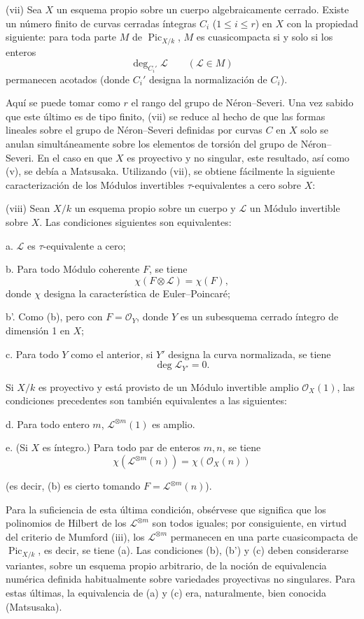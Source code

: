 \medskip
\noindent(vii) Sea $X$ un esquema propio sobre un cuerpo algebraicamente
cerrado. Existe un número finito de curvas cerradas íntegras $C_i$
($1\leq i\leq r$) en $X$ con la propiedad siguiente: para toda parte $M$ de
$\operatorname{Pic}_{X/k}$, $M$ es cuasicompacta si y solo si los enteros
\[
\deg_{C_i'}\mathcal L\qquad(\mathcal L\in M)
\]
permanecen acotados (donde $C_i'$ designa la normalización de $C_i$).

Aquí se puede tomar como $r$ el rango del grupo de Néron--Severi. Una vez
sabido que este último es de tipo finito, (vii) se reduce al hecho de que las
formas lineales sobre el grupo de Néron--Severi definidas por curvas $C$ en
$X$ solo se anulan simultáneamente sobre los elementos de torsión del grupo de
Néron--Severi. En el caso en que $X$ es proyectivo y no singular, este
resultado, así como (v), se debía a Matsusaka. Utilizando (vii), se obtiene
fácilmente la siguiente caracterización de los Módulos invertibles
$\tau$-equivalentes a cero sobre $X$:

\medskip
\noindent(viii) Sean $X/k$ un esquema propio sobre un cuerpo y $\mathcal L$ un
Módulo invertible sobre $X$. Las condiciones siguientes son equivalentes:

\noindent a. $\mathcal L$ es $\tau$-equivalente a cero;

\noindent b. Para todo Módulo coherente $F$, se tiene
\[
\chi(F\otimes\mathcal L)=\chi(F),
\]
donde $\chi$ designa la característica de Euler--Poincaré;

\noindent b'. Como (b), pero con $F=\mathcal O_Y$, donde $Y$ es un
subesquema cerrado íntegro de dimensión 1 en $X$;

\noindent c. Para todo $Y$ como el anterior, si $Y'$ designa la curva
normalizada, se tiene
\[
\deg\mathcal L_{Y'}=0.
\]

Si $X/k$ es proyectivo y está provisto de un Módulo invertible amplio
$\mathcal O_X(1)$, las condiciones precedentes son también equivalentes a las
siguientes:

\noindent d. Para todo entero $m$, $\mathcal L^{\otimes m}(1)$ es amplio.

\noindent e. (Si $X$ es íntegro.) Para todo par de enteros $m,n$, se tiene
\[
\chi(\mathcal L^{\otimes m}(n))=\chi(\mathcal O_X(n))
\]

(es decir, (b) es cierto tomando $F=\mathcal L^{\otimes m}(n)$).

Para la suficiencia de esta última condición, obsérvese que significa que los
polinomios de Hilbert de los $\mathcal L^{\otimes m}$ son todos iguales; por
consiguiente, en virtud del criterio de Mumford (iii), los
$\mathcal L^{\otimes m}$ permanecen en una parte cuasicompacta de
$\operatorname{Pic}_{X/k}$, es decir, se tiene (a). Las condiciones (b), (b')
y (c) deben considerarse variantes, sobre un esquema propio arbitrario, de la
noción de equivalencia numérica definida habitualmente sobre variedades
proyectivas no singulares. Para estas últimas, la equivalencia de (a) y (c)
era, naturalmente, bien conocida (Matsusaka).


